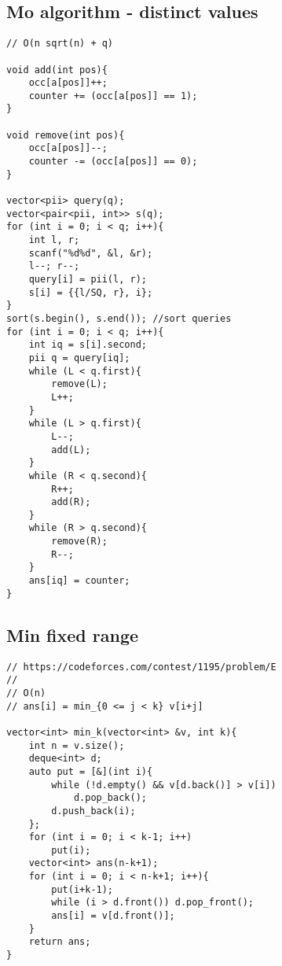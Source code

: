 \documentclass[12pt, a4paper, twoside]{article}
\begin{document}
\subsection{Mo algorithm - distinct values}
\begin{lstlisting}
// O(n sqrt(n) + q)

void add(int pos){
	occ[a[pos]]++;
	counter += (occ[a[pos]] == 1);
}

void remove(int pos){
	occ[a[pos]]--;
	counter -= (occ[a[pos]] == 0);
}

vector<pii> query(q);
vector<pair<pii, int>> s(q);
for (int i = 0; i < q; i++){
	int l, r;
	scanf("%d%d", &l, &r);
	l--; r--;
	query[i] = pii(l, r);
	s[i] = {{l/SQ, r}, i};
}
sort(s.begin(), s.end()); //sort queries
for (int i = 0; i < q; i++){
	int iq = s[i].second;
	pii q = query[iq];
	while (L < q.first){
		remove(L);
		L++;
	}	
	while (L > q.first){
		L--;
		add(L);
	}
	while (R < q.second){
		R++;
		add(R);
	}
	while (R > q.second){
		remove(R);
		R--;
	}
	ans[iq] = counter;
}

\end{lstlisting}

\subsection{Min fixed range}
\begin{lstlisting}
// https://codeforces.com/contest/1195/problem/E
//
// O(n)
// ans[i] = min_{0 <= j < k} v[i+j]

vector<int> min_k(vector<int> &v, int k){
	int n = v.size();
	deque<int> d;
	auto put = [&](int i){
		while (!d.empty() && v[d.back()] > v[i])
			d.pop_back();
		d.push_back(i);
	};
	for (int i = 0; i < k-1; i++)
		put(i);
	vector<int> ans(n-k+1);
	for (int i = 0; i < n-k+1; i++){
		put(i+k-1);
		while (i > d.front()) d.pop_front();
		ans[i] = v[d.front()];
	}
	return ans;
}
\end{lstlisting}
\end{document}
